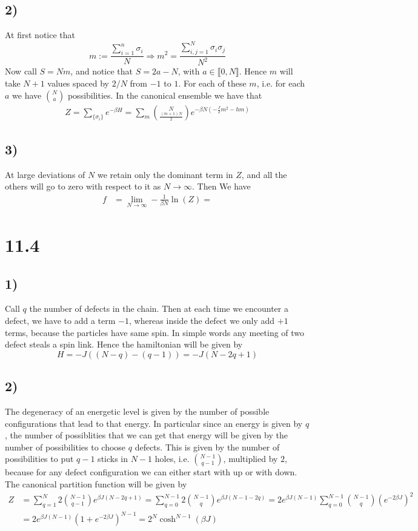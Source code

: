 \documentclass[10pt,a4paper]{book}
\begin{document}
\subsection*{2)}
At first notice that 
$$m:=\frac{\sum_{i=1}^n\sigma_i}{N} \Rightarrow m^2=\frac{\sum_{i,j=1}^N\sigma_i\sigma_j}{N^2}$$
Now call $S=Nm$, and notice that $S=2a-N$, with $a\in\llbracket 0,N\rrbracket$. Hence $m$ will take $N+1$ values spaced by $2/N$ from $-1$ to $1$. For each of these $m$, i.e. for each $a$ we have $\binom{N}{a}$ possibilities. In the canonical ensemble we have that 
\begin{align*}
Z=\sum_{\{\sigma_i\}} e^{-\beta H}=\sum_{m} \binom{N}{\frac{(m+1)N}{2}}e^{-\beta N(-\frac{J}{2}m^2-hm)}
\end{align*}

\subsection*{3)}
At large deviations of $N$ we retain only the dominant term in $Z$, and all the others will go to zero with respect to it as $N\to\infty$. Then 
We have
\begin{align*}
f&=\lim_{N\to\infty}-\frac{1}{\beta N}\ln(Z)
=
\end{align*}










\section*{11.4}
\subsection*{1)}
Call $q$ the number of defects in the chain. Then at each time we encounter a defect, we have to add a term $-1$, whereas inside the defect we only add $+1$ terms, because the particles have same spin. In simple words any meeting of two defect steals a spin link. Hence the hamiltonian will be given by 
$$H=-J((N-q)-(q-1))=-J(N-2q+1)$$

\subsection*{2)}
The degeneracy of an energetic level is given by the number of possible configurations that lead to that energy. In particular since an energy is given by $q$, the number of possiblities that we can get that energy will be given by the number of possibilities to choose $q$ defects. This is given by the number of possibilities to put $q-1$ sticks in $N-1$ holes, i.e. 
${N-1}\choose{q-1}$, multiplied by $2$, because for any defect configuration we can either start with up or with down.
The canonical partition function will be given by 
\begin{align*}
Z&=
\sum_{q=1}^N 2\binom{N-1}{q-1} e^{\beta J(N-2q+1)}=\sum_{q=0}^{N-1}2\binom{N-1}{q}e^{\beta J(N-1-2q)}=2e^{\beta J(N-1)}\sum_{q=0}^{N-1}\binom{N-1}{q}(e^{-2\beta J})^2\\
&=2e^{\beta J(N-1)}(1+e^{-2\beta J})^{N-1}=2^N\cosh^{N-1}(\beta J)
\end{align*}
\end{document}
